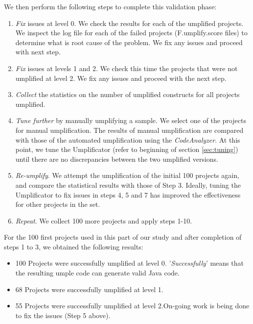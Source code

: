We then perform the following steps to complete this validation phase:

\begin{enumerate}[resume]
\item \textit{Fix} issues at level 0. We check the results for each of the umplified projects. We inspect the log file for each of the failed projects (F.umplify.score files) to determine what is root cause of the problem. We fix any issues and proceed with next step.

\item \textit{Fix} issues at levels 1 and 2. We check this time the projects that were not umplified at level 2. We fix any issues and proceed with the next step.

\item \textit{Collect} the statistics on the number of umplified constructs for all projects umplified.

\item \textit{Tune further} by manually umplifying a sample. We select one of the projects for manual umplification. The results of manual umplification are compared with those of the automated umplification using the \textit{CodeAnalyzer}. At this point, we tune the Umplificator (refer to beginning of section \ref{sec:tuning}) until there are no discrepancies between the two umplified versions. 

\item \textit{Re-umplify}. We attempt the umplification of the initial 100 projects again, and compare the statistical results with those of Step 3. Ideally, tuning the Umplificator to fix issues in steps 4, 5 and 7 has improved the effectiveness for other projects in the set.

\item \textit{Repeat}. We collect 100 more projects and apply steps 1-10. 
\end{enumerate}

For the 100 first projects used in this part of our study and after completion of steps 1 to 3, we obtained the following results:

\begin{itemize}
\item 100 Projects were successfully umplified at level 0. '\textit{Successfully}' means that the resulting umple code can generate valid Java code.

\item 68 Projects were successfully umplified at level 1. 

\item 55 Projects were successfully umplified at level 2.On-going work is being done to fix the issues (Step 5 above).
\end{itemize}


